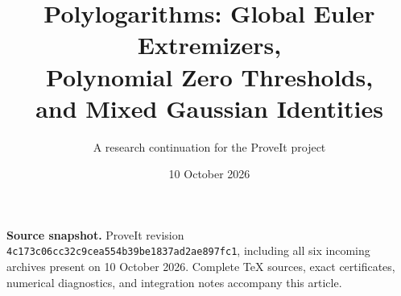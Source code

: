 \documentclass[11pt,a4paper]{article}
\title{\textbf{Polylogarithms: Global Euler Extremizers,\\Polynomial Zero Thresholds,\\and Mixed Gaussian Identities}}
\author{A research continuation for the ProveIt project}
\date{10 October 2026}
\numberwithin{equation}{section}
\theoremstyle{definition}
\theoremstyle{remark}
\begin{document}
\maketitle

\vfill
\noindent\small
\textbf{Source snapshot.} ProveIt revision
\texttt{4c173c06cc32c9cea554b39be1837ad2ae897fc1}, including all six
incoming archives present on 10 October 2026. Complete TeX sources,
exact certificates, numerical diagnostics, and integration notes
accompany this article.\normalsize
\clearpage
\tableofcontents
\clearpage

\clearpage





\clearpage


\end{document}
